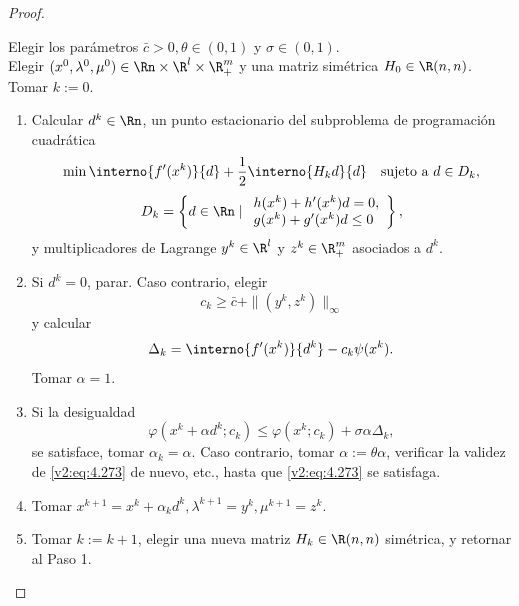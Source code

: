 \begin{proof}
\begin{algorithm}
\label{v2:alg:4.6.3}
Elegir los parámetros $\bar{c} > 0, \theta \in (0, 1)$ y $\sigma \in (0, 1)$. \\
Elegir $(x^0, \lambda^0, \mu^0) \in \Rn \times \R^l \times \R^m_+$ y una matriz simétrica $H_0 \in \R(n,n)$. Tomar $k := 0$.
\begin{enumerate}
    \item Calcular $d^k \in \Rn$, un punto estacionario del subproblema de programación cuadrática
    \begin{equation}
    \min \interno{f'(x^k)}{d} + \frac{1}{2} \interno{H_k d}{d} \quad \text{sujeto a } d \in D_k,
    \label{v2:eq:4.269}
    \end{equation}
    \begin{equation}
    D_k = \left\{ d \in \Rn \mid \begin{array}{l} h(x^k) + h'(x^k)d = 0, \\ g(x^k) + g'(x^k)d \le 0 \end{array} \right\},
    \label{v2:eq:4.270}
    \end{equation}
    y multiplicadores de Lagrange $y^k \in \R^l$ y $z^k \in \R^m_+$ asociados a $d^k$.
    \item Si $d^k = 0$, parar. Caso contrario, elegir
    \begin{equation}
    c_k \ge \bar{c} + \|(y^k, z^k)\|_\infty
    \label{v2:eq:4.271}
    \end{equation}
    y calcular
    \begin{equation}
    \Delta_k = \interno{f'(x^k)}{d^k} - c_k \psi(x^k).
    \label{v2:eq:4.272}
    \end{equation}
    Tomar $\alpha = 1$.
    \item Si la desigualdad
    \begin{equation}
    \varphi(x^k + \alpha d^k; c_k) \le \varphi(x^k; c_k) + \sigma \alpha \Delta_k,
    \label{v2:eq:4.273}
    \end{equation}
    se satisface, tomar $\alpha_k = \alpha$. Caso contrario, tomar $\alpha := \theta \alpha$, verificar la validez de \eqref{v2:eq:4.273} de nuevo, etc., hasta que \eqref{v2:eq:4.273} se satisfaga.
    \item Tomar $x^{k+1} = x^k + \alpha_k d^k, \lambda^{k+1} = y^k, \mu^{k+1} = z^k$.
    \item Tomar $k := k + 1$, elegir una nueva matriz $H_k \in \R(n,n)$ simétrica, y retornar al Paso 1.
\end{enumerate}
\end{algorithm}


\end{proof}
